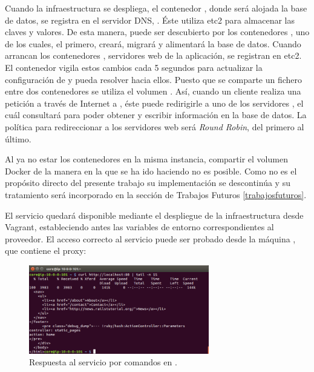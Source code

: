 Cuando la infraestructura se despliega, el contenedor , donde será alojada la base de datos, se registra en el servidor DNS, . Éste utiliza etc2 para almacenar las claves y valores. De esta manera,  puede ser descubierto por los contenedores , uno de los cuales, el primero, creará, migrará y alimentará la base de datos. Cuando arrancan los contenedores , servidores web de la aplicación, se registran en etc2. El contenedor  vigila estos cambios cada 5 segundos para actualizar la configuración de  y pueda resolver hacia ellos. Puesto que se comparte un fichero entre dos contenedores se utiliza el volumen . Así, cuando un cliente realiza una petición a través de Internet a , éste puede redirigirle a uno de los servidores , el cuál consultará  para poder obtener y escribir información en la base de datos. La política para redireccionar a los servidores web será \textit{Round Robin}, del primero al último.

Al ya no estar los contenedores en la misma instancia, compartir el volumen Docker  de la manera en la que se ha ido haciendo no es posible. Como no es el propósito directo del presente trabajo su implementación se descontinúa y su tratamiento será incorporado en la sección de Trabajos Futuros \ref{trabajosfuturos}.

El servicio quedará disponible mediante el despliegue de la infraestructura desde Vagrant, estableciendo antes las variables de entorno correspondientes al proveedor. El acceso correcto al servicio puede ser probado desde la máquina , que contiene el proxy:


\begin{figure}[H]
\centering
\includegraphics[width=0.7\textwidth]{images/figures/curl-confd.png}
\caption{Respuesta al servicio por comandos en .}
\end{figure}

